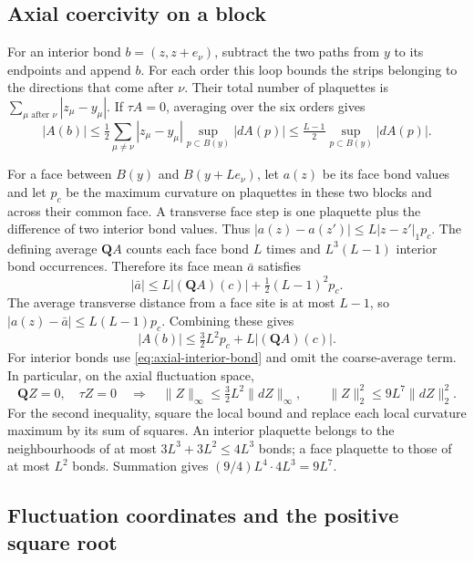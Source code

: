 \documentclass[11pt,letterpaper,reqno]{amsart}
\begin{document}
\subsection{Axial coercivity on a block}\label{subsec:photon-axial-coercivity}

For an interior bond $b=(z,z+e_\nu)$, subtract the two
paths from $y$ to its endpoints and append $b$. For each order this
loop bounds the strips belonging to the directions that come after
$\nu$. Their total number of plaquettes is
$\sum_{\mu\text{ after }\nu}|z_\mu-y_\mu|$. If $\tau A=0$,
averaging over the six orders gives
\begin{equation}\label{eq:axial-interior-bond}
 |A(b)|\le\tfrac12\sum_{\mu\ne\nu}|z_\mu-y_\mu|
           \sup_{p\subset B(y)}|dA(p)|
       \le\tfrac{L-1}{2}\sup_{p\subset B(y)}|dA(p)|.
\end{equation}

For a face between $B(y)$ and $B(y+Le_\nu)$, let $a(z)$ be its face
bond values and let $p_c$ be the maximum curvature on plaquettes in
these two blocks and across their common face. A transverse face step
is one plaquette plus the difference of two interior bond values.
Thus $|a(z)-a(z')|\le L|z-z'|_1p_c$.
The defining average $\mathbf QA$ counts each face bond $L$ times
and $L^3(L-1)$ interior bond occurrences. Therefore its face mean
$\bar a$ satisfies
\[
 |\bar a|\le L|(\mathbf QA)(c)|
                       +\tfrac12(L-1)^2p_c.
\]
The average transverse distance from a face site is at most $L-1$,
so $|a(z)-\bar a|\le L(L-1)p_c$. Combining these gives
\begin{equation}\label{eq:axial-local-bond-bound}
 |A(b)|\le\tfrac32L^2p_c+L|(\mathbf QA)(c)|.
\end{equation}
For interior bonds use \eqref{eq:axial-interior-bond} and omit the
coarse-average term. In particular, on the axial fluctuation space,
\begin{equation}\label{eq:axial-fluctuation-coercivity}
 \mathbf QZ=0,\quad\tau Z=0
     \quad\Longrightarrow\quad
 \|Z\|_\infty\le\tfrac32L^2\|dZ\|_\infty,\qquad
 \|Z\|_2^2\le9L^7\|dZ\|_2^2.
\end{equation}
For the second inequality, square the local bound and replace each
local curvature maximum by its sum of squares. An interior plaquette
belongs to the neighbourhoods of at most $3L^3+3L^2\le4L^3$ bonds;
a face plaquette to those of at most $L^2$ bonds. Summation gives
$(9/4)L^4\cdot4L^3=9L^7$.

\subsection{Fluctuation coordinates and the positive square root}
\label{subsec:photon-fluctuation-root}
\end{document}
